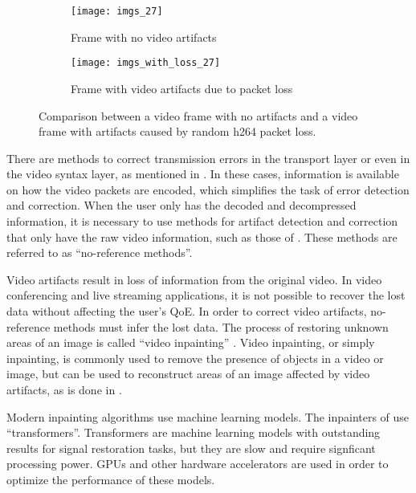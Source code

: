 \begin{figure} [!h]
  \centering
  
  \begin{subfigure}[t]{0.49\textwidth}
    \centering
    \texttt{[image: imgs\_27]}
    \caption{Frame with no video artifacts}
    \label{fig:frame_comparison.a}
  \end{subfigure}
  \hfill
  \begin{subfigure}[t]{0.49\textwidth}
    \centering
    \texttt{[image: imgs\_with\_loss\_27]}
    \caption{Frame with video artifacts due to packet loss}
    \label{fig:frame_comparison.b}
  \end{subfigure}
  
  \caption{Comparison between a video frame with no artifacts and a video frame with artifacts caused by random h264 packet loss.}
  \label{fig:frame_comparison}

\end{figure}

There are methods to correct transmission errors in the transport layer or even in the video syntax layer, as mentioned in \cite{Sanyal2021}. In these cases, information is available on how the video packets are encoded, which simplifies the task of error detection and correction. When the user only has the decoded and decompressed information, it is necessary to use methods for artifact detection and correction that only have the raw video information, such as those of \cite{Vranjes2018, Sanyal2021,Goodall2019}. These methods are referred to as ``no-reference methods''.

Video artifacts result in loss of information from the original video. In video conferencing and live streaming applications, it is not possible to recover the lost data without affecting the user's QoE. In order to correct video artifacts, no-reference methods must infer the lost data. The process of restoring unknown areas of an image is called ``video inpainting'' \cite{Li2022, Zhou2021}. Video inpainting, or simply inpainting, is commonly used to remove the presence of objects in a video or image, but can be used to reconstruct areas of an image affected by video artifacts, as is done in \cite{Dong2023, Brenes2022}.

Modern inpainting algorithms use machine learning models. The inpainters of \cite{Li2022, Zhou2021, Liu2021} use ``transformers''. Transformers are machine learning models with outstanding results for signal restoration tasks, but they are slow and require signficant processing power. GPUs and other hardware accelerators are used in order to optimize the performance of these models.

